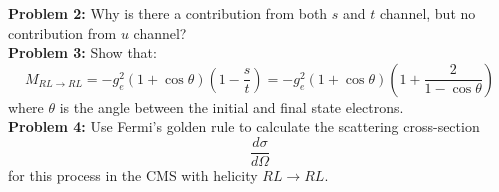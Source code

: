 \documentclass[12pt]{article}
\begin{document}
\noindent
{\bf Problem 2:}
Why is there a contribution from both $s$ and $t$ channel, but no
contribution from $u$ channel?\\[5pt]

\noindent
{\bf Problem 3:}
Show that:
$$M_{RL \to RL} = -g^2_e  (1 + \cos \theta) \left(1 - \frac{s}{t} \right) = -g^2_e  (1 + \cos \theta) \left(1 + \frac{2}{1-\cos \theta} \right)$$
where $\theta$ is the angle between the initial and final state electrons.\\[5pt]

\noindent
{\bf Problem 4:}
Use Fermi's golden rule to calculate the scattering cross-section
$$\frac{d\sigma}{d\Omega}$$
for this process in the CMS with helicity $RL \to RL$.\\[5pt]
\end{document}
